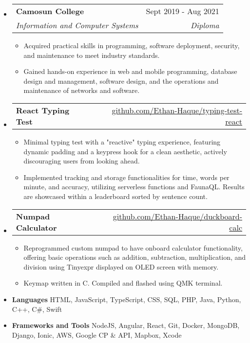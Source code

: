 \documentclass[letterpaper,11pt]{article}[leftmargin=*]
\makeatletter
\def \entryspacing {-0pt}
\renewcommand{\section}[2]{\vspace{5pt}
  \tcbox[on line,boxsep=0pt,left=2pt,right=2pt,top=2pt,bottom=2pt,colback=secondary]
  {\color{white}\raggedbottom\normalsize\textbf{{#1}{\hspace{7pt}#2}}}
}
\newcommand{\resumeEntryStart}{\begin{itemize}[leftmargin=2.5mm]}
\newcommand{\resumeEntryEnd}{\end{itemize}\vspace{\entryspacing}}
\newcommand{\resumeItemListStart}{\begin{itemize}[leftmargin=4.5mm]}
\newcommand{\resumeItemListEnd}{\end{itemize}}
\newcommand{\resumeItem}[1]{
  \item\small{
    {#1 \vspace{-2pt}}
  }
}
\newcommand{\resumeEntryTSDL}[4]{
  \vspace{-1pt}\item[]
    \begin{tabularx}{0.97\textwidth}{X@{\hspace{60pt}}r}
      \textbf{\color{primary}#1} & {\firabook\color{accent}\small#2} \\
      \textit{\color{accent}\small#3} & \textit{\color{accent}\small#4} \\
    \end{tabularx}\vspace{-6pt}
}
\newcommand{\resumeEntryTD}[2]{
  \vspace{-1pt}\item[]
    \begin{tabularx}{0.97\textwidth}{X@{\hspace{60pt}}r}
      \textbf{\color{primary}#1} & {\firabook\color{accent}\small#2} \\
    \end{tabularx}\vspace{-6pt}
}
\newcommand{\resumeEntryS}[2]{
  \item[]\small{
    \textbf{\color{primary}#1 }{ #2 \vspace{-6pt}}
  }
}
\makeatother
\begin{document}
\section{\faGraduationCap}{Education}
  \resumeEntryStart
    \resumeEntryTSDL
      {Camosun College}{Sept 2019 - Aug 2021}
      {Information and Computer Systems}{Diploma}
      \resumeItemListStart
      \resumeItem {Acquired practical skills in programming, software deployment, security, and maintenance to meet industry standards.}
      \resumeItem{Gained hands-on experience in web and mobile programming, database design and management, software design, and the operations and maintenance of networks and software.}
      \resumeItemListEnd
  \resumeEntryEnd
  
  
\section{\faFlask}{Projects}

\resumeEntryStart
    \resumeEntryTD
      {React Typing Test}{\href{https://github.com/Ethan-Haque/typing-test-react}{github.com/Ethan-Haque/typing-test-react}}
    \resumeItemListStart
      \resumeItem {Minimal typing test with a "reactive" typing experience, featuring dynamic padding and a keypress hook for a clean aesthetic, actively discouraging users from looking ahead.}
      \resumeItem {Implemented tracking and storage functionalities for time, words per minute, and accuracy, utilizing serverless functions and FaunaQL. Results are showcased within a leaderboard sorted by sentence count.}
    \resumeItemListEnd
  
    \resumeEntryTD
      {Numpad Calculator}{\href{https://github.com/Ethan-Haque/duckboard-calc}{github.com/Ethan-Haque/duckboard-calc}}
    \resumeItemListStart
      \resumeItem {Reprogrammed custom numpad to have onboard calculator functionality, offering basic operations such as addition, subtraction, multiplication, and division using Tinyexpr displayed on OLED screen with memory.}
      \resumeItem {Keymap written in C. Compiled and flashed using QMK terminal.}
    \resumeItemListEnd
  \resumeEntryEnd
\section{\faGears}{Skills}
 \resumeEntryStart
  \resumeEntryS{Languages} {HTML, JavaScript, TypeScript, CSS, SQL, PHP, Java, Python, C++, C\#, Swift}
  \resumeEntryS{Frameworks and Tools} {NodeJS, Angular, React, Git, Docker, MongoDB, Django, Ionic, AWS, Google CP \& API, Mapbox, Xcode}
 \resumeEntryEnd
\end{document}
